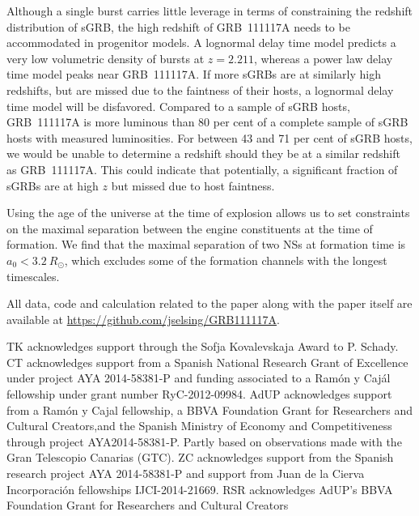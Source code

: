 \documentclass{aa}    %
\begin{document}
Although a single burst carries little leverage in terms of constraining the
redshift distribution of sGRB, the high redshift of GRB~111117A needs to be
accommodated in progenitor models. A lognormal delay time model predicts a very
low volumetric density of bursts at $z = 2.211$, whereas a power law delay time
model peaks near GRB~111117A. If more sGRBs are at similarly high redshifts, but
are missed due to the faintness of their hosts, a lognormal delay time model
will be disfavored. Compared to a sample of sGRB hosts, GRB~111117A is more
luminous than 80 per cent of a complete sample of sGRB hosts with measured
luminosities. For between 43 and 71 per cent of sGRB hosts, we would be unable
to determine a redshift should they be at a similar redshift as GRB~111117A.
This could indicate that potentially, a significant fraction of sGRBs are at
high $z$ but missed due to host faintness.

Using the age of the universe at the time of explosion allows us to set
constraints on the maximal separation between the engine constituents at the
time of formation. We find that the maximal separation of two NSs at
formation time is $a_0 < 3.2~R_\odot$, which excludes some of the formation
channels with the longest timescales.

All data, code and calculation related to the paper along with the
paper itself are available at \url{https://github.com/jselsing/GRB111117A}.

\begin{acknowledgements}
	
TK acknowledges support through the Sofja Kovalevskaja Award to P. Schady. 
CT acknowledges support from a Spanish National Research Grant of Excellence under project AYA 2014-58381-P and funding associated to a Ramón y Cajál fellowship under grant number RyC-2012-09984.
AdUP acknowledges support from a Ramón y Cajal fellowship, a BBVA Foundation Grant for Researchers and Cultural Creators,and the Spanish Ministry of Economy and Competitiveness through project AYA2014-58381-P.
Partly based on observations made with the Gran Telescopio Canarias (GTC).
ZC acknowledges support from the Spanish research project AYA 2014-58381-P and support from Juan de la Cierva Incorporaci\'on fellowships IJCI-2014-21669. 
RSR acknowledges AdUP's BBVA Foundation Grant for Researchers and Cultural Creators

\end{acknowledgements}



\end{document}
